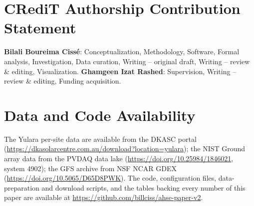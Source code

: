 \documentclass[preprint,12pt]{elsarticle}
\begin{document}
\section*{CRediT Authorship Contribution Statement}
\textbf{Bilali Boureima Cissé}: Conceptualization, Methodology,
Software, Formal analysis, Investigation, Data curation, Writing --
original draft, Writing -- review \& editing, Visualization.
\textbf{Ghamgeen Izat Rashed}: Supervision, Writing -- review \&
editing, Funding acquisition.

\section*{Data and Code Availability}
The Yulara per-site data are available from the DKASC portal
(\url{https://dkasolarcentre.com.au/download?location=yulara}); the NIST Ground array data from the
PVDAQ data lake (\url{https://doi.org/10.25984/1846021}, system 4902); the GFS archive from NSF NCAR
GDEX (\url{https://doi.org/10.5065/D65D8PWK}). The code, configuration files, data-preparation and
download scripts, and the tables backing every number of this paper are available at
\url{https://github.com/billciss/ahse-paper-v2}.



\end{document}
